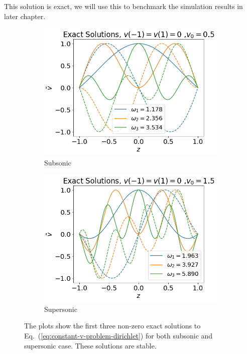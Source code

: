 This solution is exact, we will use this to benchmark the simulation results in later chapter.

\begin{figure}[htbp]
	\centering
	\begin{subfigure}{0.5\textwidth}
		\includegraphics[width=\linewidth]{figures/exact-fixed-fixed-v0=0.5}
		\caption{Subsonic}
	\end{subfigure}%
	\begin{subfigure}{0.5\textwidth}
		\includegraphics[width=\linewidth]{figures/exact-fixed-fixed-v0=1.5}
		\caption{Supersonic}
	\end{subfigure}
	\caption{The plots show the first three non-zero exact solutions to Eq.~(\ref{eq:constant-v-problem-dirichlet}) for both subsonic and supersonic case. These solutions are stable.}
	\label{fig:exact-v-dirichlet}
\end{figure}


